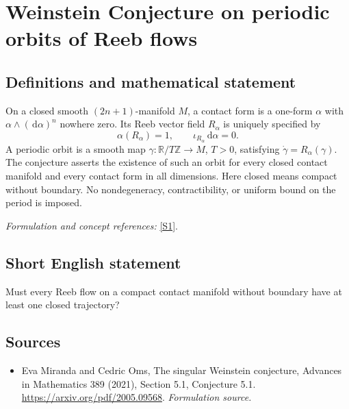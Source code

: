 \documentclass[11pt]{article}
\begin{document}
\section*{\texorpdfstring{Weinstein Conjecture on periodic orbits of Reeb flows}{Weinstein Conjecture on periodic orbits of Reeb flows}}\label{169}
\subsection{Definitions and mathematical statement}
On a closed smooth $(2n+1)$-manifold $M$, a contact form is a one-form $\alpha$ with $\alpha\wedge({\,\mathrm{d}}\alpha)^n$ nowhere zero. Its Reeb vector field $R_\alpha$ is uniquely specified by
\[
 \alpha(R_\alpha)=1,\qquad \iota_{R_\alpha}{\,\mathrm{d}}\alpha=0.
\]
A periodic orbit is a smooth map $\gamma:{\mathbb{R}}/T{\mathbb{Z}}\to M$, $T>0$, satisfying $\dot\gamma=R_\alpha(\gamma)$. The conjecture asserts the existence of such an orbit for every closed contact manifold and every contact form in all dimensions. Here closed means compact without boundary. No nondegeneracy, contractibility, or uniform bound on the period is imposed.
\par\smallskip\textit{Formulation and concept references:} \href{https://arxiv.org/pdf/2005.09568}{[S1]}.

\subsection{Short English statement}
Must every Reeb flow on a compact contact manifold without boundary have at least one closed trajectory?
\subsection{Sources}
\begin{itemize}
\item[S1]Eva Miranda and Cedric Oms, The singular Weinstein conjecture, Advances in Mathematics 389 (2021), Section 5.1, Conjecture 5.1.
\url{https://arxiv.org/pdf/2005.09568}.
\textit{Formulation source.}
\end{itemize}
\end{document}
